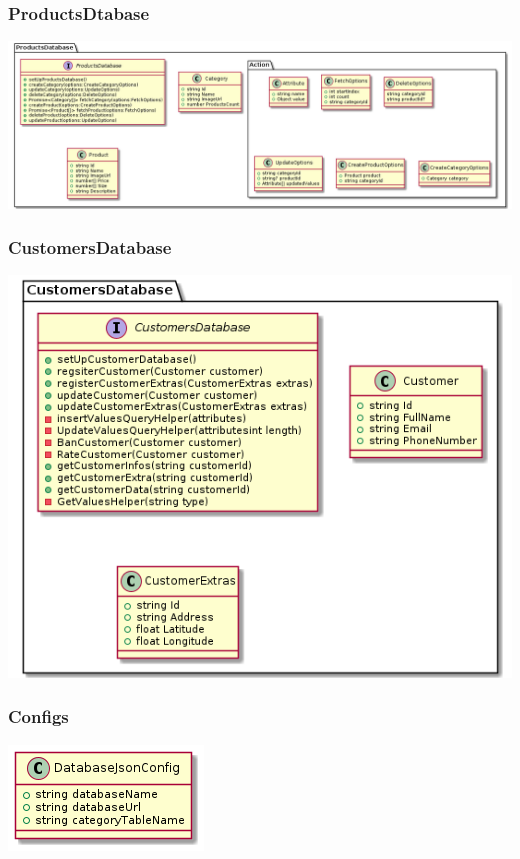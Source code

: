 \documentclass{article}
\begin{document}
\subsubsection{ProductsDtabase}
\includegraphics[scale=0.38]{./out/NodeApp/Database/ProductsDatabase.png}

\subsubsection{CustomersDatabase}
\includegraphics[scale=0.75]{./out/NodeApp/Database/CustomersDatabase.png}

\subsubsection{Configs}
\includegraphics[scale=1]{./out/NodeApp/Database/SharedConfigFile.png}
\end{document}
